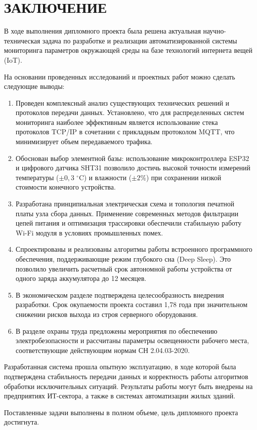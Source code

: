\chapter*{ЗАКЛЮЧЕНИЕ}

В ходе выполнения дипломного проекта была решена актуальная научно-техническая задача по разработке и реализации автоматизированной системы мониторинга параметров окружающей среды на базе технологий интернета вещей (IoT).

На основании проведенных исследований и проектных работ можно сделать следующие выводы:

\begin{enumerate}
    \item Проведен комплексный анализ существующих технических решений и протоколов передачи данных. Установлено, что для распределенных систем мониторинга наиболее эффективным является использование стека протоколов TCP/IP в сочетании с прикладным протоколом MQTT, что минимизирует объем передаваемого трафика.
    
    \item Обоснован выбор элементной базы: использование микроконтроллера ESP32 и цифрового датчика SHT31 позволило достичь высокой точности измерений температуры ($\pm 0,3$ $^\circ$C) и влажности ($\pm 2\%$) при сохранении низкой стоимости конечного устройства.
    
    \item Разработана принципиальная электрическая схема и топология печатной платы узла сбора данных. Применение современных методов фильтрации цепей питания и оптимизация трассировки обеспечили стабильную работу Wi-Fi модуля в условиях промышленных помех.
    
    \item Спроектированы и реализованы алгоритмы работы встроенного программного обеспечения, поддерживающие режим глубокого сна (Deep Sleep). Это позволило увеличить расчетный срок автономной работы устройства от одного заряда аккумулятора до 12 месяцев.
    
    \item В экономическом разделе подтверждена целесообразность внедрения разработки. Срок окупаемости проекта составил 1,78 года при значительном снижении рисков выхода из строя серверного оборудования.
    
    \item В разделе охраны труда предложены мероприятия по обеспечению электробезопасности и рассчитаны параметры освещенности рабочего места, соответствующие действующим нормам СН 2.04.03-2020.
\end{enumerate}

Разработанная система прошла опытную эксплуатацию, в ходе которой была подтверждена стабильность передачи данных и корректность работы алгоритмов обработки исключительных ситуаций. Результаты работы могут быть внедрены на предприятиях ИТ-сектора, а также в системах автоматизации жилых зданий.

Поставленные задачи выполнены в полном объеме, цель дипломного проекта достигнута.

\newpage